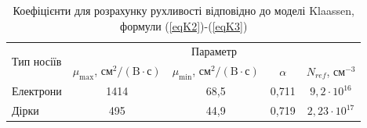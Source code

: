 \documentclass[10pt,a5paper,titlepage,oneside]{book}
\numberwithin{equation}{part}
\begin{document}
\begin{table}
\caption{Коефіцієнти для розрахунку рухливості відповідно до моделі Klaassen, формули (\ref{eqK2})-(\ref{eqK3})}
\label{tblK1}
\centering
\begin{tabular}{|l|c|c|c|c|}
\hline
\multirow{2}{*}{Тип носіїв} & \multicolumn{4}{c|}{Параметр} \\
\cline{2-5}
&$\mu_\mathrm{max}$, $\text{см}^2/(\text{B}\cdot\text{с})$&$\mu_\mathrm{min}$, $\text{см}^2/(\text{B}\cdot\text{с})$&$\alpha$&$N_{ref}$, см$^{-3}$ \rule{0pt}{13pt}\\
\hline
Електрони&1414&68,5&0,711&$9,2\cdot10^{16}$\\
Дірки&495&44,9&0,719&$2,23\cdot10^{17}$\\
\hline
\end{tabular}
\end{table}
\end{document}
